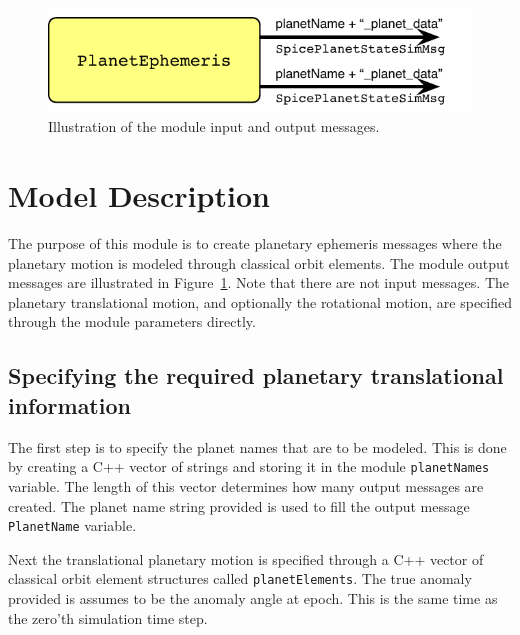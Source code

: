 

\begin{figure}[h]
	\centerline{
		\includegraphics{Figures/moduleImg}
	}
	\caption{Illustration of the module input and output messages.}
	\label{fig:moduleImg}
\end{figure}


\section{Model Description}
The purpose of this module is to create planetary ephemeris messages where the planetary motion is modeled through classical orbit elements.  The module output messages are illustrated in Figure~\ref{fig:moduleImg}.  Note that there are not input messages.  The planetary translational motion, and optionally the rotational motion, are specified through the module parameters directly.  


\subsection{Specifying the required planetary translational information}
The first step is to specify the planet names that are to be modeled.  This is done by creating a C++ vector of strings and storing it in the module {\tt planetNames} variable.  The length of this vector determines how many output messages are created.  The planet name string provided is used to fill the output message {\tt PlanetName} variable.

Next the translational planetary motion is specified through a C++ vector of classical orbit element structures called {\tt planetElements}.  The true anomaly provided is assumes to be the anomaly angle at epoch.  This is the same time as the zero'th simulation time step. 






